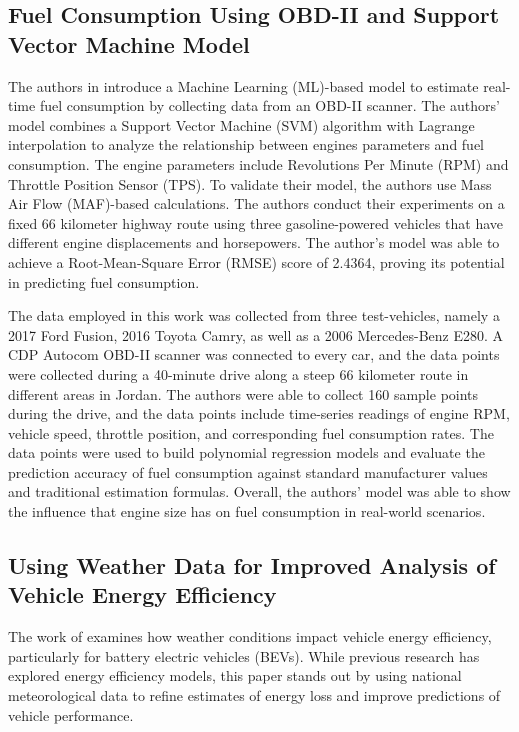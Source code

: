 \documentclass[letterpaper]{article}
\begin{document}

\subsection*{Fuel Consumption Using OBD-II and Support Vector Machine Model}

The authors in \cite{abukhalil2020fuel} introduce a Machine Learning (ML)-based
model to estimate real-time fuel consumption by collecting data from an OBD-II
scanner. The authors’ model combines a Support Vector Machine (SVM) algorithm
with Lagrange interpolation to analyze the relationship between engines
parameters and fuel consumption. The engine parameters include Revolutions Per
Minute (RPM) and Throttle Position Sensor (TPS). To validate their model, the
authors use Mass Air Flow (MAF)-based calculations. The authors conduct their
experiments on a fixed 66 kilometer highway route using three gasoline-powered
vehicles that have different engine displacements and horsepowers. The author’s
model was able to achieve a Root-Mean-Square Error (RMSE) score of 2.4364,
proving its potential in predicting fuel consumption. 

The data employed in this
work was collected from three test-vehicles, namely a 2017 Ford Fusion, 2016
Toyota Camry, as well as a 2006 Mercedes-Benz E280. A CDP Autocom OBD-II scanner
was connected to every car, and the data points were collected during a
40-minute drive along a steep 66 kilometer route in different areas in Jordan.
The authors were able to collect 160 sample points during the drive, and the
data points include time-series readings of engine RPM, vehicle speed, throttle
position, and corresponding fuel consumption rates. The data points were used to
build polynomial regression models and evaluate the prediction accuracy of fuel
consumption against standard manufacturer values and traditional estimation
formulas. Overall, the authors' model was able to show the influence that engine
size has on fuel consumption in real-world scenarios.

\subsection*{Using Weather Data for Improved Analysis of Vehicle Energy
Efficiency}

The work of \cite{filla2025using} examines how weather conditions impact vehicle energy
efficiency, particularly for battery electric vehicles (BEVs). While previous
research has explored energy efficiency models, this paper stands out by using
national meteorological data to refine estimates of energy loss and improve
predictions of vehicle performance. 
\end{document}
